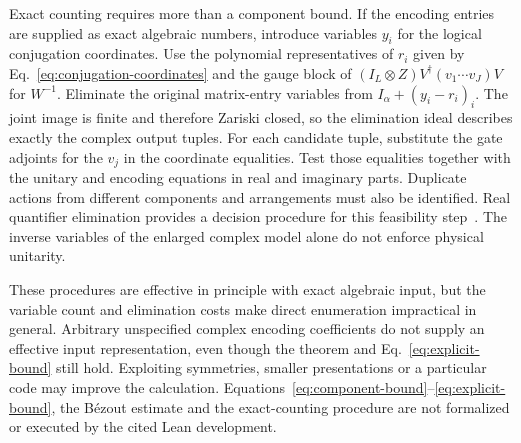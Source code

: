 \documentclass[aps,prl,reprint,notitlepage,nofootinbib,nobibnotes]{revtex4-2}
\newcommand{\id}{I}
\begin{document}
Exact counting requires more than a component bound. If the encoding
entries are supplied as exact algebraic numbers, introduce variables
\(y_i\) for the logical conjugation coordinates. Use the polynomial
representatives of \(r_i\) given by Eq.~\eqref{eq:conjugation-coordinates}
and the gauge block of
\((\id_L\otimes Z)V^\dagger(v_1\cdots v_J)V\) for \(W^{-1}\).
Eliminate the original matrix-entry variables from
\(I_\alpha+(y_i-r_i)_i\).
The joint image is finite and therefore Zariski closed, so the
elimination ideal describes exactly the complex output tuples.
For each candidate tuple, substitute the gate adjoints for the
\(v_j\) in the coordinate equalities. Test those equalities together
with the unitary and encoding equations in real and imaginary parts.
Duplicate actions from different components and arrangements must
also be identified. Real quantifier elimination provides a decision procedure
for this feasibility step~\cite{BasuPollackRoy}. The inverse variables
of the enlarged complex model alone do not enforce physical unitarity.

These procedures are effective in principle with exact algebraic
input, but the variable count and elimination costs make direct
enumeration impractical in general. Arbitrary unspecified complex
encoding coefficients do not supply an effective input representation,
even though the theorem and Eq.~\eqref{eq:explicit-bound} still hold.
Exploiting symmetries, smaller presentations or a particular code may
improve the calculation. Equations~\eqref{eq:component-bound}--\eqref{eq:explicit-bound},
the B\'ezout estimate and the exact-counting procedure are not
formalized or executed by the cited Lean development.
\end{document}

